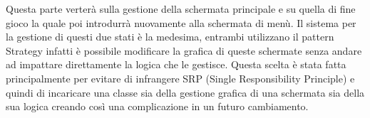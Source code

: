 \documentclass[a4paper,12pt]{report}
\begin{document}
    \par Questa parte verterà sulla gestione della schermata principale e su quella di fine gioco la quale poi introdurrà nuovamente
     alla schermata di menù. Il sistema per la gestione di questi due stati è la medesima, entrambi utilizzano il pattern Strategy
     infatti è possibile modificare la grafica di queste schermate senza andare ad impattare direttamente la logica che le gestisce.
     Questa scelta è stata fatta principalmente per evitare di infrangere SRP (Single Responsibility Principle) e quindi
     di incaricare una classe sia della gestione grafica di una schermata sia della sua logica creando così una complicazione
     in un futuro cambiamento.
    \par
\end{document}
